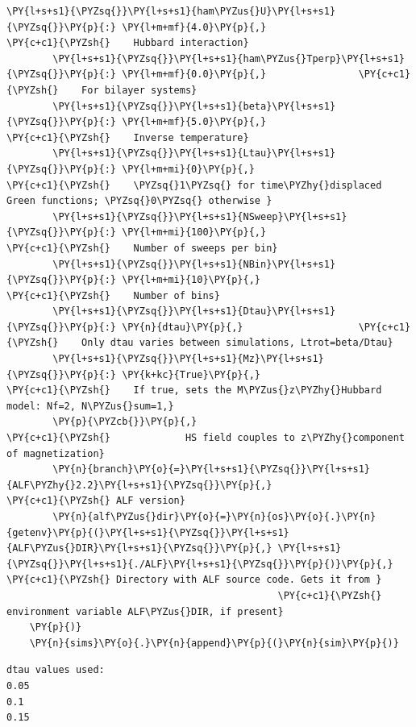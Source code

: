 \begin{tcolorbox}[breakable, size=fbox, boxrule=1pt, pad at break*=1mm,colback=cellbackground, colframe=cellborder]
\begin{Verbatim}[commandchars=\\\{\}]
        \PY{l+s+s1}{\PYZsq{}}\PY{l+s+s1}{ham\PYZus{}U}\PY{l+s+s1}{\PYZsq{}}\PY{p}{:} \PY{l+m+mf}{4.0}\PY{p}{,}                    \PY{c+c1}{\PYZsh{}    Hubbard interaction}
        \PY{l+s+s1}{\PYZsq{}}\PY{l+s+s1}{ham\PYZus{}Tperp}\PY{l+s+s1}{\PYZsq{}}\PY{p}{:} \PY{l+m+mf}{0.0}\PY{p}{,}                \PY{c+c1}{\PYZsh{}    For bilayer systems}
        \PY{l+s+s1}{\PYZsq{}}\PY{l+s+s1}{beta}\PY{l+s+s1}{\PYZsq{}}\PY{p}{:} \PY{l+m+mf}{5.0}\PY{p}{,}                     \PY{c+c1}{\PYZsh{}    Inverse temperature}
        \PY{l+s+s1}{\PYZsq{}}\PY{l+s+s1}{Ltau}\PY{l+s+s1}{\PYZsq{}}\PY{p}{:} \PY{l+m+mi}{0}\PY{p}{,}                       \PY{c+c1}{\PYZsh{}    \PYZsq{}1\PYZsq{} for time\PYZhy{}displaced Green functions; \PYZsq{}0\PYZsq{} otherwise }
        \PY{l+s+s1}{\PYZsq{}}\PY{l+s+s1}{NSweep}\PY{l+s+s1}{\PYZsq{}}\PY{p}{:} \PY{l+m+mi}{100}\PY{p}{,}                   \PY{c+c1}{\PYZsh{}    Number of sweeps per bin}
        \PY{l+s+s1}{\PYZsq{}}\PY{l+s+s1}{NBin}\PY{l+s+s1}{\PYZsq{}}\PY{p}{:} \PY{l+m+mi}{10}\PY{p}{,}                      \PY{c+c1}{\PYZsh{}    Number of bins}
        \PY{l+s+s1}{\PYZsq{}}\PY{l+s+s1}{Dtau}\PY{l+s+s1}{\PYZsq{}}\PY{p}{:} \PY{n}{dtau}\PY{p}{,}                    \PY{c+c1}{\PYZsh{}    Only dtau varies between simulations, Ltrot=beta/Dtau}
        \PY{l+s+s1}{\PYZsq{}}\PY{l+s+s1}{Mz}\PY{l+s+s1}{\PYZsq{}}\PY{p}{:} \PY{k+kc}{True}\PY{p}{,}                      \PY{c+c1}{\PYZsh{}    If true, sets the M\PYZus{}z\PYZhy{}Hubbard model: Nf=2, N\PYZus{}sum=1,}
        \PY{p}{\PYZcb{}}\PY{p}{,}                               \PY{c+c1}{\PYZsh{}             HS field couples to z\PYZhy{}component of magnetization}
        \PY{n}{branch}\PY{o}{=}\PY{l+s+s1}{\PYZsq{}}\PY{l+s+s1}{ALF\PYZhy{}2.2}\PY{l+s+s1}{\PYZsq{}}\PY{p}{,}                \PY{c+c1}{\PYZsh{} ALF version}
        \PY{n}{alf\PYZus{}dir}\PY{o}{=}\PY{n}{os}\PY{o}{.}\PY{n}{getenv}\PY{p}{(}\PY{l+s+s1}{\PYZsq{}}\PY{l+s+s1}{ALF\PYZus{}DIR}\PY{l+s+s1}{\PYZsq{}}\PY{p}{,} \PY{l+s+s1}{\PYZsq{}}\PY{l+s+s1}{./ALF}\PY{l+s+s1}{\PYZsq{}}\PY{p}{)}\PY{p}{,} \PY{c+c1}{\PYZsh{} Directory with ALF source code. Gets it from }
                                               \PY{c+c1}{\PYZsh{} environment variable ALF\PYZus{}DIR, if present}
    \PY{p}{)}
    \PY{n}{sims}\PY{o}{.}\PY{n}{append}\PY{p}{(}\PY{n}{sim}\PY{p}{)}
\end{Verbatim}
\end{tcolorbox}

    \begin{Verbatim}[commandchars=\\\{\}]
dtau values used:
0.05
0.1
0.15
    \end{Verbatim}

